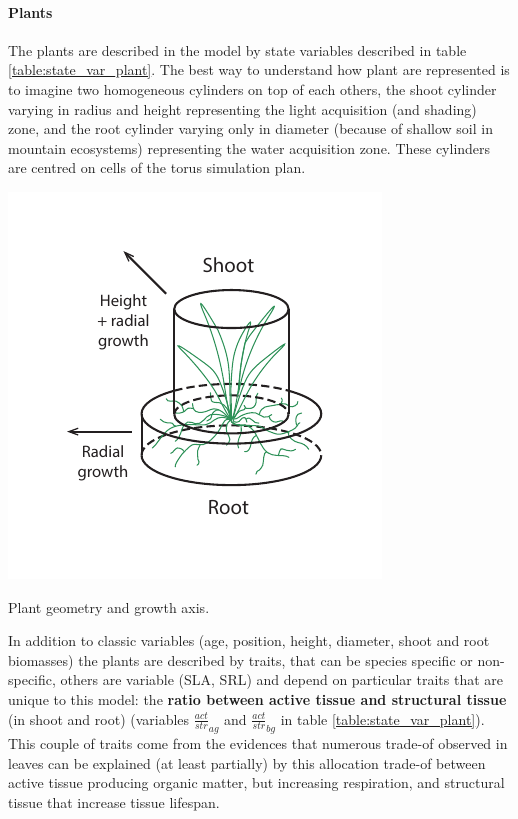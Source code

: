 \documentclass[a4paper,twoside, justified,marginals=raggedright, nobib]{tufte-handout}
\begin{document}
\paragraph{Plants} The plants are described in the model by state variables described in table \ref{table:state_var_plant}. The best way to understand how plant are represented is to imagine two homogeneous cylinders on top of each others, the shoot cylinder varying in radius and height representing the light acquisition (and shading) zone, and the root cylinder varying only in diameter (because of shallow soil in mountain ecosystems) representing the water acquisition zone. These cylinders are centred on cells of the torus simulation plan.\\
\begin{marginfigure}
\includegraphics{./Figures/plant_geometry_m.pdf}
\caption{Plant geometry and growth axis.}
\end{marginfigure}
\indent In addition to classic variables (age, position, height, diameter, shoot and root biomasses) the plants are described by traits, that can be species specific or non-specific, others are variable (SLA, SRL) and depend on particular traits that are unique to this model: the \textbf{ratio between active tissue and structural tissue} (in shoot and root) (variables $\frac{act}{str}_{ag}$ and $\frac{act}{str}_{bg}$ in table \ref{table:state_var_plant}). This couple of traits come from the evidences that numerous trade-of observed in leaves can be explained (at least partially) by this allocation trade-of between active tissue producing organic matter, but increasing respiration, and structural tissue that increase tissue lifespan.
\end{document}
